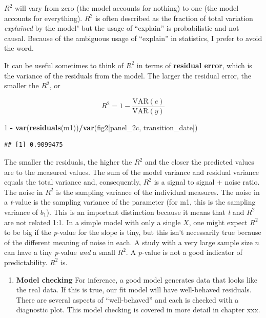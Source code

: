 \documentclass[]{book}
\newenvironment{Shaded}{\begin{snugshade}}{\end{snugshade}}
\newcommand{\DecValTok}[1]{\textcolor[rgb]{0.00,0.00,0.81}{#1}}
\newcommand{\KeywordTok}[1]{\textcolor[rgb]{0.13,0.29,0.53}{\textbf{#1}}}
\newcommand{\NormalTok}[1]{#1}
\newcommand{\OperatorTok}[1]{\textcolor[rgb]{0.81,0.36,0.00}{\textbf{#1}}}
\newcommand{\StringTok}[1]{\textcolor[rgb]{0.31,0.60,0.02}{#1}}
\providecommand{\tightlist}{%
  \setlength{\itemsep}{0pt}\setlength{\parskip}{0pt}}
\begin{document}
\(R^2\) will vary from zero (the model accounts for nothing) to one (the model accounts for everything). \(R^2\) is often described as the fraction of total variation \emph{explained} by the model" but the usage of ``explain'' is probabilistic and not causal. Because of the ambiguous usage of ``explain'' in statistics, I prefer to avoid the word.

It can be useful sometimes to think of \(R^2\) in terms of \textbf{residual error}, which is the variance of the residuals from the model. The larger the residual error, the smaller the \(R^2\), or

\begin{equation}
R^2 = 1 - \frac{\mathrm{VAR}(e)}{\mathrm{VAR}(y)}
\end{equation}

\begin{Shaded}
\begin{Highlighting}[]
\DecValTok{1} \OperatorTok{-}\StringTok{ }\KeywordTok{var}\NormalTok{(}\KeywordTok{residuals}\NormalTok{(m1))}\OperatorTok{/}\KeywordTok{var}\NormalTok{(fig2[panel_2c, transition_date])}
\end{Highlighting}
\end{Shaded}

\begin{verbatim}
## [1] 0.9099475
\end{verbatim}

The smaller the residuals, the higher the \(R^2\) and the closer the predicted values are to the measured values. The sum of the model variance and residual variance equals the total variance and, consequently, \(R^2\) is a signal to signal + noise ratio. The noise in \(R^2\) is the sampling variance of the individual measures. The noise in a \emph{t}-value is the sampling variance of the parameter (for m1, this is the sampling variance of \(b_1\)). This is an important distinction because it means that \emph{t} and \(R^2\) are not related 1:1. In a simple model with only a single \(X\), one might expect \(R^2\) to be big if the \emph{p}-value for the slope is tiny, but this isn't necessarily true because of the different meaning of noise in each. A study with a very large sample size \(n\) can have a tiny \emph{p}-value \emph{and} a small \(R^2\). A \emph{p}-value is not a good indicator of predictability. \(R^2\) is.

\begin{enumerate}
\def\labelenumi{\arabic{enumi}.}
\setcounter{enumi}{1}
\tightlist
\item
  \textbf{Model checking} For inference, a good model generates data that looks like the real data. If this is true, our fit model will have well-behaved residuals. There are several aspects of ``well-behaved'' and each is checked with a diagnostic plot. This model checking is covered in more detail in chapter xxx.
\end{enumerate}
\end{document}
